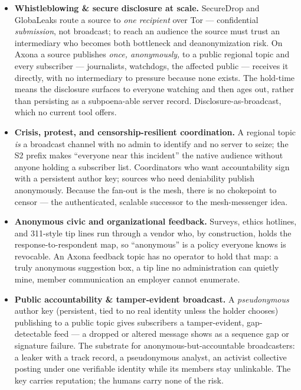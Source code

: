 \documentclass[nobib]{tufte-handout}
\begin{document}
\begin{itemize}
\item \textbf{Whistleblowing \& secure disclosure at scale.} SecureDrop
and GlobaLeaks route a source to \emph{one recipient} over Tor ---
confidential \emph{submission}, not broadcast; to reach an audience the
source must trust an intermediary who becomes both bottleneck and
deanonymization risk. On Axona a source publishes \emph{once,
anonymously,} to a public regional topic and every subscriber ---
journalists, watchdogs, the affected public --- receives it directly,
with no intermediary to pressure because none exists. The hold-time means
the disclosure surfaces to everyone watching and then ages out, rather
than persisting as a subpoena-able server record. Disclosure-as-broadcast,
which no current tool offers.
\item \textbf{Crisis, protest, and censorship-resilient coordination.} A
regional topic \emph{is} a broadcast channel with no admin to identify
and no server to seize; the S2 prefix makes ``everyone near this
incident'' the native audience without anyone holding a subscriber list.
Coordinators who want accountability sign with a persistent author key;
sources who need deniability publish anonymously. Because the fan-out is
the mesh, there is no chokepoint to censor --- the authenticated,
scalable successor to the mesh-messenger idea.
\item \textbf{Anonymous civic and organizational feedback.} Surveys,
ethics hotlines, and 311-style tip lines run through a vendor who, by
construction, holds the response-to-respondent map, so ``anonymous'' is a
policy everyone knows is revocable. An Axona feedback topic has no
operator to hold that map: a truly anonymous suggestion box, a tip line
no administration can quietly mine, member communication an employer
cannot enumerate.
\item \textbf{Public accountability \& tamper-evident broadcast.} A
\emph{pseudonymous} author key (persistent, tied to no real identity
unless the holder chooses) publishing to a public topic gives subscribers
a tamper-evident, gap-detectable feed --- a dropped or altered message
shows as a sequence gap or signature failure. The substrate for
anonymous-but-accountable broadcasters: a leaker with a track record, a
pseudonymous analyst, an activist collective posting under one verifiable
identity while its members stay unlinkable. The key carries reputation;
the humans carry none of the risk.
\end{itemize}
\end{document}
